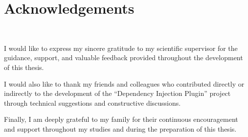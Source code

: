\chapter*{Acknowledgements}
~

I would like to express my sincere gratitude to my scientific supervisor for the guidance, support, and valuable feedback provided throughout the development of this thesis.

I would also like to thank my friends and colleagues who contributed directly or indirectly to the development of the “Dependency Injection Plugin” project through technical suggestions and constructive discussions.

Finally, I am deeply grateful to my family for their continuous encouragement and support throughout my studies and during the preparation of this thesis.